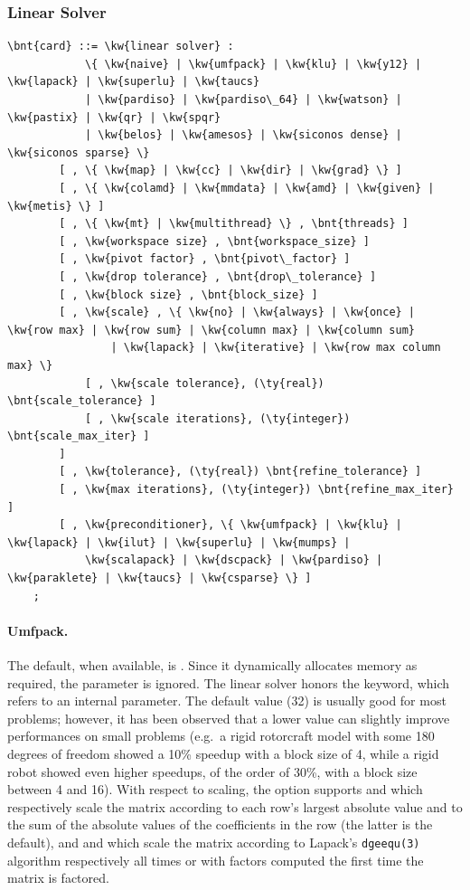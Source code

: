 \subsubsection{Linear Solver}   
\label{sec:LINEAR-SOLVER}
\begin{Verbatim}[commandchars=\\\{\}]
    \bnt{card} ::= \kw{linear solver} :
            \{ \kw{naive} | \kw{umfpack} | \kw{klu} | \kw{y12} | \kw{lapack} | \kw{superlu} | \kw{taucs} 
            | \kw{pardiso} | \kw{pardiso\_64} | \kw{watson} | \kw{pastix} | \kw{qr} | \kw{spqr}
            | \kw{belos} | \kw{amesos} | \kw{siconos dense} | \kw{siconos sparse} \}
        [ , \{ \kw{map} | \kw{cc} | \kw{dir} | \kw{grad} \} ]
        [ , \{ \kw{colamd} | \kw{mmdata} | \kw{amd} | \kw{given} | \kw{metis} \} ]
        [ , \{ \kw{mt} | \kw{multithread} \} , \bnt{threads} ]
        [ , \kw{workspace size} , \bnt{workspace_size} ] 
        [ , \kw{pivot factor} , \bnt{pivot\_factor} ]
        [ , \kw{drop tolerance} , \bnt{drop\_tolerance} ]
        [ , \kw{block size} , \bnt{block_size} ]
        [ , \kw{scale} , \{ \kw{no} | \kw{always} | \kw{once} | \kw{row max} | \kw{row sum} | \kw{column max} | \kw{column sum}
                | \kw{lapack} | \kw{iterative} | \kw{row max column max} \}
            [ , \kw{scale tolerance}, (\ty{real}) \bnt{scale_tolerance} ]
            [ , \kw{scale iterations}, (\ty{integer}) \bnt{scale_max_iter} ]
        ]
        [ , \kw{tolerance}, (\ty{real}) \bnt{refine_tolerance} ]
        [ , \kw{max iterations}, (\ty{integer}) \bnt{refine_max_iter} ]
        [ , \kw{preconditioner}, \{ \kw{umfpack} | \kw{klu} | \kw{lapack} | \kw{ilut} | \kw{superlu} | \kw{mumps} | 
            \kw{scalapack} | \kw{dscpack} | \kw{pardiso} | \kw{paraklete} | \kw{taucs} | \kw{csparse} \} ]
    ;
\end{Verbatim}

\paragraph{Umfpack.}
The default, when available, is .
Since it dynamically allocates memory as required, the  
parameter is ignored.
The  linear solver honors the  keyword,
which refers to an internal parameter.
The default value (32) is usually good for most problems; however,
it has been observed that a lower value can slightly improve
performances on small problems (e.g.\ a rigid rotorcraft model
with some 180 degrees of freedom showed a 10\% speedup with 
a block size of 4, while a rigid robot showed even higher speedups,
of the order of 30\%, with a block size between 4 and 16).
With respect to scaling, the  option supports  and 
which respectively scale the matrix according to each row's
largest absolute value and to the sum of the absolute values
of the coefficients in the row (the latter is the default),
and  and  which scale the matrix
according to Lapack's \texttt{dgeequ(3)} algorithm
respectively all times or with factors computed the first time
the matrix is factored.

